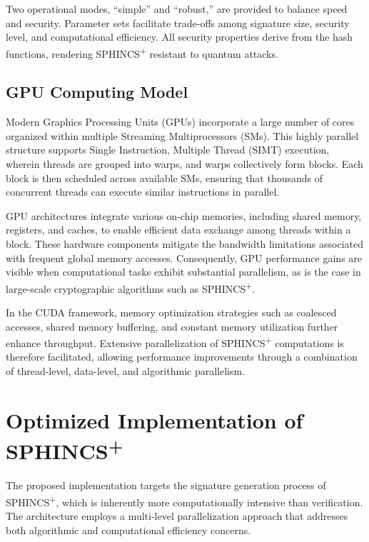 \documentclass[journal]{IEEEtran}
\begin{document}
Two operational modes, “simple” and “robust,” are provided to balance speed and security. Parameter sets facilitate trade-offs among signature size, security level, and computational efficiency. All security properties derive from the hash functions, rendering SPHINCS\textsuperscript{+} resistant to quantum attacks.

\subsection{GPU Computing Model}

Modern Graphics Processing Units (GPUs) incorporate a large number of cores organized within multiple Streaming Multiprocessors (SMs). This highly parallel structure supports Single Instruction, Multiple Thread (SIMT) execution, wherein threads are grouped into warps, and warps collectively form blocks. Each block is then scheduled across available SMs, ensuring that thousands of concurrent threads can execute similar instructions in parallel.

GPU architectures integrate various on-chip memories, including shared memory, registers, and caches, to enable efficient data exchange among threads within a block. These hardware components mitigate the bandwidth limitations associated with frequent global memory accesses. Consequently, GPU performance gains are visible when computational tasks exhibit substantial parallelism, as is the case in large-scale cryptographic algorithms such as SPHINCS\textsuperscript{+}.

In the CUDA framework, memory optimization strategies such as coalesced accesses, shared memory buffering, and constant memory utilization further enhance throughput. Extensive parallelization of SPHINCS\textsuperscript{+} computations is therefore facilitated, allowing performance improvements through a combination of thread-level, data-level, and algorithmic parallelism.

\section{Optimized Implementation of \texorpdfstring{SPHINCS\textsuperscript{+}}{SPHINCS+}}\label{sec:implementation}

The proposed implementation targets the signature generation process of SPHINCS\textsuperscript{+}, which is inherently more computationally intensive than verification. The architecture employs a multi-level parallelization approach that addresses both algorithmic and computational efficiency concerns.
\end{document}
